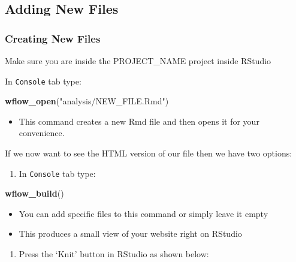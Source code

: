 \documentclass[openany]{book}
\newenvironment{Shaded}{\begin{snugshade}}{\end{snugshade}}
\newcommand{\KeywordTok}[1]{\textcolor[rgb]{0.13,0.29,0.53}{\textbf{#1}}}
\newcommand{\NormalTok}[1]{#1}
\newcommand{\StringTok}[1]{\textcolor[rgb]{0.31,0.60,0.02}{#1}}
\providecommand{\tightlist}{%
  \setlength{\itemsep}{0pt}\setlength{\parskip}{0pt}}
\begin{document}
\hypertarget{adding-new-files}{%
\subsection{Adding New Files}\label{adding-new-files}}

\hypertarget{creating-new-files}{%
\subsubsection{Creating New Files}\label{creating-new-files}}

Make sure you are inside the PROJECT\_NAME project inside RStudio

In \texttt{Console} tab type:

\begin{Shaded}
\begin{Highlighting}[]
\KeywordTok{wflow_open}\NormalTok{(}\StringTok{"analysis/NEW_FILE.Rmd"}\NormalTok{)}
\end{Highlighting}
\end{Shaded}

\begin{itemize}
\tightlist
\item
  This command creates a new Rmd file and then opens it for your convenience.
\end{itemize}

If we now want to see the HTML version of our file then we have two options:

\begin{enumerate}
\def\labelenumi{\arabic{enumi}.}
\tightlist
\item
  In \texttt{Console} tab type:
\end{enumerate}

\begin{Shaded}
\begin{Highlighting}[]
\KeywordTok{wflow_build}\NormalTok{()}
\end{Highlighting}
\end{Shaded}

\begin{itemize}
\tightlist
\item
  You can add specific files to this command or simply leave it empty
\item
  This produces a small view of your website right on RStudio
\end{itemize}

\begin{enumerate}
\def\labelenumi{\arabic{enumi}.}
\setcounter{enumi}{1}
\tightlist
\item
  Press the `Knit' button in RStudio as shown below:
\end{enumerate}
\end{document}
